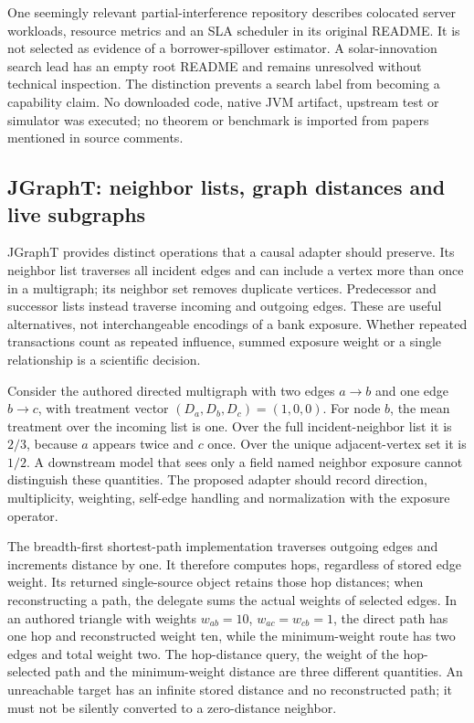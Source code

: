 One seemingly relevant partial-interference repository describes colocated server workloads, resource metrics and an SLA scheduler in its original README. It is not selected as evidence of a borrower-spillover estimator. A solar-innovation search lead has an empty root README and remains unresolved without technical inspection. The distinction prevents a search label from becoming a capability claim. No downloaded code, native JVM artifact, upstream test or simulator was executed; no theorem or benchmark is imported from papers mentioned in source comments.~\citep{exec25_jnet_choice}

\subsection{JGraphT: neighbor lists, graph distances and live subgraphs}

JGraphT provides distinct operations that a causal adapter should preserve. Its neighbor list traverses all incident edges and can include a vertex more than once in a multigraph; its neighbor set removes duplicate vertices. Predecessor and successor lists instead traverse incoming and outgoing edges. These are useful alternatives, not interchangeable encodings of a bank exposure. Whether repeated transactions count as repeated influence, summed exposure weight or a single relationship is a scientific decision.~\citep{exec25_jnet_jgrapht}

Consider the authored directed multigraph with two edges $a\to b$ and one edge $b\to c$, with treatment vector $(D_a,D_b,D_c)=(1,0,0)$. For node $b$, the mean treatment over the incoming list is one. Over the full incident-neighbor list it is $2/3$, because $a$ appears twice and $c$ once. Over the unique adjacent-vertex set it is $1/2$. A downstream model that sees only a field named neighbor exposure cannot distinguish these quantities. The proposed adapter should record direction, multiplicity, weighting, self-edge handling and normalization with the exposure operator.~\citep{exec25_jnet_choice}

The breadth-first shortest-path implementation traverses outgoing edges and increments distance by one. It therefore computes hops, regardless of stored edge weight. Its returned single-source object retains those hop distances; when reconstructing a path, the delegate sums the actual weights of selected edges. In an authored triangle with weights $w_{ab}=10$, $w_{ac}=w_{cb}=1$, the direct path has one hop and reconstructed weight ten, while the minimum-weight route has two edges and total weight two. The hop-distance query, the weight of the hop-selected path and the minimum-weight distance are three different quantities. An unreachable target has an infinite stored distance and no reconstructed path; it must not be silently converted to a zero-distance neighbor.~\citep{exec25_jnet_jgrapht,exec25_jnet_choice}

